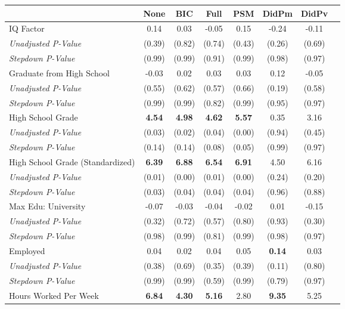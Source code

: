 \begin{tabular}{l c c c c c c c}
\toprule
 & None & BIC & Full & PSM & DidPm & DidPv \\
\midrule
IQ Factor & 0.14 & 0.03 & -0.05 & 0.15 & -0.24 & -0.11 \\
\quad \textit{Unadjusted P-Value} & (0.39) & (0.82) & (0.74) & (0.43) & (0.26) & (0.69) \\
\quad \textit{Stepdown P-Value} & (0.99) & (0.99) & (0.91) & (0.99) & (0.98) & (0.97) \\
Graduate from High School & -0.03 & 0.02 & 0.03 & 0.03 & 0.12 & -0.05 \\
\quad \textit{Unadjusted P-Value} & (0.55) & (0.62) & (0.57) & (0.66) & (0.19) & (0.58) \\
\quad \textit{Stepdown P-Value} & (0.99) & (0.99) & (0.82) & (0.99) & (0.95) & (0.97) \\
High School Grade & \textbf{ 4.54 } & \textbf{ 4.98 } & \textbf{ 4.62 } & \textbf{ 5.57 } & 0.35 & 3.16 \\
\quad \textit{Unadjusted P-Value} & (0.03) & (0.02) & (0.04) & (0.00) & (0.94) & (0.45) \\
\quad \textit{Stepdown P-Value} & (0.14) & (0.14) & (0.08) & (0.05) & (0.99) & (0.97) \\
High School Grade (Standardized) & \textbf{ 6.39 } & \textbf{ 6.88 } & \textbf{ 6.54 } & \textbf{ 6.91 } & 4.50 & 6.16 \\
\quad \textit{Unadjusted P-Value} & (0.01) & (0.00) & (0.01) & (0.00) & (0.24) & (0.20) \\
\quad \textit{Stepdown P-Value} & (0.03) & (0.04) & (0.04) & (0.04) & (0.96) & (0.88) \\
Max Edu: University & -0.07 & -0.03 & -0.04 & -0.02 & 0.01 & -0.15 \\
\quad \textit{Unadjusted P-Value} & (0.32) & (0.72) & (0.57) & (0.80) & (0.93) & (0.30) \\
\quad \textit{Stepdown P-Value} & (0.98) & (0.99) & (0.81) & (0.99) & (0.98) & (0.97) \\
Employed & 0.04 & 0.02 & 0.04 & 0.05 & \textbf{ 0.14 } & 0.03 \\
\quad \textit{Unadjusted P-Value} & (0.38) & (0.69) & (0.35) & (0.39) & (0.11) & (0.80) \\
\quad \textit{Stepdown P-Value} & (0.99) & (0.99) & (0.59) & (0.99) & (0.79) & (0.97) \\
Hours Worked Per Week & \textbf{ 6.84 } & \textbf{ 4.30 } & \textbf{ 5.16 } & 2.80 & \textbf{ 9.35 } & 5.25 \\

\end{tabular}
